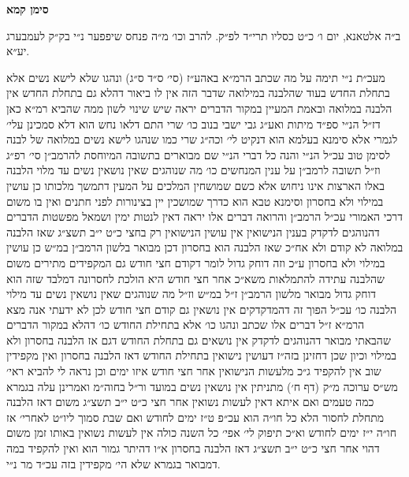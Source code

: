 \documentclass[12pt, openany]{book}
\newcommand{\chapname}{}
\newcommand{\newchap}[1]{
	\addcontentsline{toc}{chapter}{#1}
	\renewcommand{\chapname}{#1}
		\begin{center}
			\textbf{%
\fontsize{16pt}{16pt}\selectfont
				#1}
		\end{center}
}
\begin{document}
\newchap{סימן קמא}
\begin{multicols}{2}
ב״ה אלטאנא, יום ו׳ כ״ט כסליו תרי״ד לפ״ק. להרב וכו׳ מ״ה פנחס שיפפער נ״י בק״ק לעמבערג יע״א.\\\vspace{0pt}

מעכ״ת נ״י תימה על מה שכתב הרמ״א באהע״ז (סי׳ ס״ד ס״ג) ונהגו שלא לישא נשים אלא בתחלת החדש בעוד שהלבנה במילואה שדבר הזה אין לו ביאור דהלא גם בתחלת החדש אין הלבנה במלואה ובאמת המעיין במקור הדברים יראה שיש שינוי לשון ממה שהביא רמ״א כאן דז״ל הנ״י ספ״ד מיתות ואע״ג גבי ישבי בנוב כו׳ שרי התם דלאו נחש הוא דלא סמכינן עלי׳ לגמרי אלא סימנא בעלמא הוא דנקיט לי׳ וכה״ג שרי כמו שנהגו לישא נשים במלואה של לבנה לסימן טוב עכ״ל הנ״י והנה כל דברי הנ״י שם מבוארים בתשובה המיוחסת להרמב״ן סי׳ רפ״ג וז״ל תשובה לרמב״ן על ענין המנחשים כו׳ מה שנוהגים שאין נושאין נשים עד מלוי הלבנה באלו הארצות אינו ניחוש אלא כשם שמושחין המלכים על המעין דתמשך מלכותו כן עושין במילוי ולא בחסרון וסימנא טבא הוא כדרך שמושכין יין בצינורות לפני חתנים ואין בו משום דרכי האמורי עכ״ל הרמב״ן והרואה דברים אלו יראה דאין לנטות ימין ושמאל מפשטות הדברים דהנוהגים לדקדק בענין הנישואין אין עושין הנישואין רק בחצי כ״ט י״ב תשצ״ג שאז הלבנה במלואה לא קודם ולא אח״כ שאז הלבנה הוא בחסרון דכן מבואר בלשון הרמב״ן במ״ש כן עושין במילוי ולא בחסרון ע״כ וזה דוחק גדול לומר דקודם חצי חודש גם המקפידים מתירים משום שהלבנה עתידה להתמלאות משא״כ אחר חצי חודש היא הולכת לחסרונה דמלבד שזה הוא דוחק גדול מבואר מלשון הרמב״ן ז״ל במ״ש וז״ל מה שנוהגים שאין נושאין נשים עד מילוי הלבנה כו׳ עכ״ל הפוך זה דהמדקדקים אין נושאין גם קודם חצי חודש לכן לא ידעתי אנה מצא הרמ״א ז״ל דברים אלו שכתב ונהגו כו׳ אלא בתחילת החודש כו׳ דהלא במקור הדברים שהבאתי מבואר דהנוהגים לדקדק אין נושאים גם בתחלת החודש דגם אז הלבנה בחסרון ולא במילוי וכיון שכן דחזינן בזה״ז דעושין נישואין בתחילת החודש דאז הלבנה בחסרון ואין מקפידין שוב אין להקפיד ג״כ מלעשות הנישואין אחר חצי חודש איזו ימים וכן נראה לי להביא ראי׳ מש״ס ערוכה מ״ק (דף ח׳) מתניתין אין נושאין נשים במועד ור״ל בחוה״מ ואמרינן עלה בגמרא כמה טעמים ואם איתא דאין לעשות נשואין אחר חצי כ״ט י״ב תשצ״ג משום דאז הלבנה מתחלת לחסור הלא כל חו״ה הוא עכ״פ ט״ז ימים לחודש ואם שבת סמוך ליו״ט לאחרי׳ אז חו״ה י״ז ימים לחודש וא״כ תיפוק לי׳ אפי׳ כל השנה כולה אין לעשות נשואין באותו זמן משום דהוי אחר חצי כ״ט י״ב תשצ״ג דאז הלבנה בחסרון א״ו דהיתר גמור הוא ואין להקפיד במה דמבואר בגמרא שלא הי׳ מקפידין בזה עכ״ד מר נ״י.\\\vspace{0pt}


\end{multicols}
\end{document}

